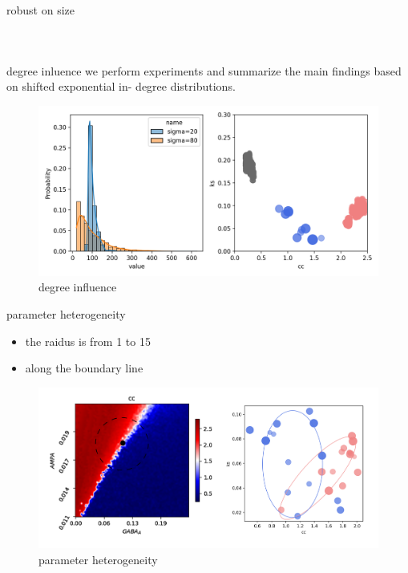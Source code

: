 \documentclass{beamer}
\begin{document}
\begin{frame}{robust on size}
\begin{columns}
\begin{figure}[htbp]
		\end{figure}
	\end{columns}
\end{frame}

\begin{frame}{degree inluence}
	we perform experiments and summarize the main findings based on shifted exponential in- degree distributions.
	\centering
	\begin{figure}[htbp]
	\centering
	\includegraphics[width=0.85\linewidth]{fig/degree_influence}
	\caption{degree influence}
	\end{figure}
\end{frame}

\begin{frame}{parameter heterogeneity}
	\begin{itemize}
		\item the raidus is from 1 to 15
		\item along the boundary line
	\end{itemize}
	\centering
	\begin{figure}[htbp]
		\centering
		\includegraphics[width=0.8\linewidth]{fig/reparameter_all}
		\caption{parameter heterogeneity} 
	\end{figure}
\end{frame}
\end{document}
